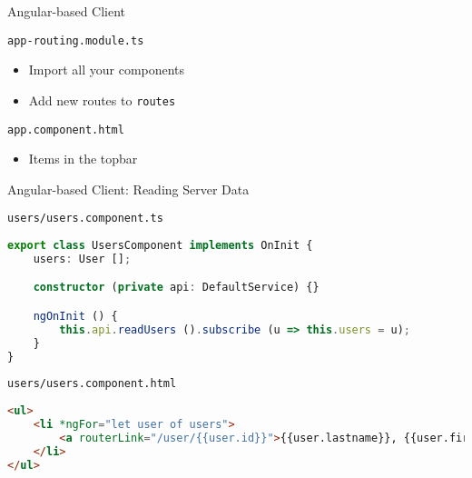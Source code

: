 \begin{frame}{Angular-based Client}
    \begin{block}{\lstinline{app-routing.module.ts}}
        \begin{itemize}
            \item Import all your components
            \item Add new routes to \lstinline{routes}
        \end{itemize}
    \end{block}

    \begin{block}{\lstinline{app.component.html}}
        \begin{itemize}
            \item Items in the topbar
        \end{itemize}
    \end{block}
\end{frame}


\begin{frame}[fragile]{Angular-based Client: Reading Server Data}
    \begin{block}{\lstinline{users/users.component.ts}}
\begin{lstlisting}[language=typescript,style=mini]
export class UsersComponent implements OnInit {
    users: User [];

    constructor (private api: DefaultService) {}

    ngOnInit () {
        this.api.readUsers ().subscribe (u => this.users = u);
    }
}
\end{lstlisting}
    \end{block}

    \begin{block}{\lstinline{users/users.component.html}}
\begin{lstlisting}[language=html,style=mini]
<ul>
    <li *ngFor="let user of users">
        <a routerLink="/user/{{user.id}}">{{user.lastname}}, {{user.firstname}}</a>
    </li>
</ul>
\end{lstlisting}
    \end{block}
\end{frame}


